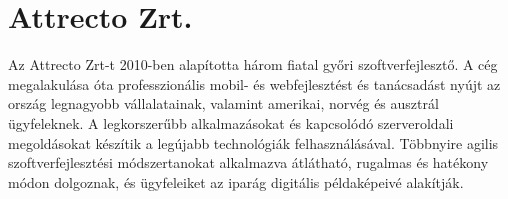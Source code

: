 \section{Attrecto Zrt.}

Az Attrecto Zrt-t 2010-ben alapította három fiatal győri szoftverfejlesztő. A cég megalakulása óta professzionális mobil- és webfejlesztést és tanácsadást nyújt az ország legnagyobb vállalatainak, valamint amerikai, norvég és ausztrál ügyfeleknek. A legkorszerűbb alkalmazásokat és kapcsolódó szerveroldali megoldásokat készítik a legújabb technológiák felhasználásával. Többnyire agilis szoftverfejlesztési módszertanokat alkalmazva átlátható, rugalmas és hatékony módon dolgoznak, és ügyfeleiket az iparág digitális példaképeivé alakítják.
